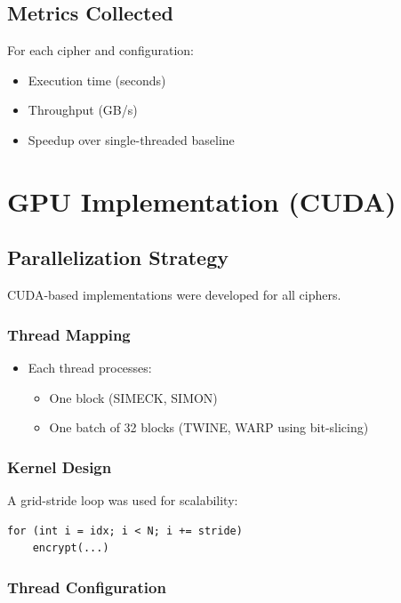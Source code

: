 \subsection{Metrics Collected}

For each cipher and configuration:
\begin{itemize}
    \item Execution time (seconds)
    \item Throughput (GB/s)
    \item Speedup over single-threaded baseline
\end{itemize}

\section{GPU Implementation (CUDA)}

\subsection{Parallelization Strategy}

CUDA-based implementations were developed for all ciphers.

\subsubsection{Thread Mapping}

\begin{itemize}
    \item Each thread processes:
    \begin{itemize}
        \item One block (SIMECK, SIMON)
        \item One batch of 32 blocks (TWINE, WARP using bit-slicing)
    \end{itemize}
\end{itemize}

\subsubsection{Kernel Design}

A grid-stride loop was used for scalability:

\begin{verbatim}
for (int i = idx; i < N; i += stride)
    encrypt(...)
\end{verbatim}

\subsubsection{Thread Configuration}

